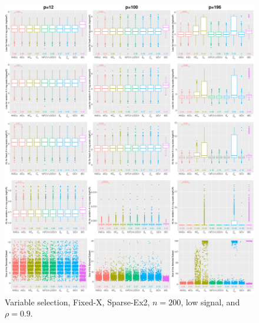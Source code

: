 \begin{figure}[!ht]
\centering
\includegraphics[width=\textwidth]{figures/supplement/fixedx/subset_selection/Sparse-Ex2_n200_lsnr_rho09.eps}
\caption{Variable selection, Fixed-X, Sparse-Ex2, $n=200$, low signal, and $\rho=0.9$.}
\end{figure}
\clearpage
